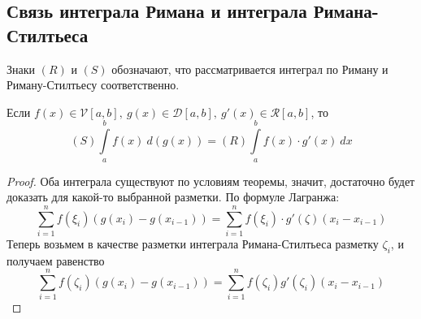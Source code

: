 \subsection{Связь интеграла Римана и интеграла Римана-Стилтьеса}
Знаки $(R)$ и $(S)$ обозначают, что рассматривается интеграл по Риману и Риману-Стилтьесу соответственно.
\begin{theorem}
    Если $f(x)\in \mathcal{V}[a,b],\ g(x)\in \mathcal{D}[a,b],\ g'(x)\in \mathcal{R}[a,b]$, то
    \[(S)\int\limits_{a}^{b}f(x)\ d(g(x))=(R)\int\limits_{a}^{b}f(x)\cdot g'(x)\ dx\]
\end{theorem} 
\begin{proof}
    Оба интеграла существуют по условиям теоремы, значит, достаточно будет доказать для какой-то выбранной разметки. По формуле Лагранжа:
    \[\sum\limits_{i=1}^{n}f(\xi_i)(g(x_i)-g(x_{i-1}))=\sum\limits_{i=1}^{n}f(\xi_i)\cdot g'(\zeta)(x_i-x_{i-1})\]
    Теперь возьмем в качестве разметки интеграла Римана-Стилтьеса разметку $\zeta_i$, и получаем равенство
    \[\sum\limits_{i=1}^{n}f(\zeta_i)(g(x_i)-g(x_{i-1}))=\sum\limits_{i=1}^{n}f(\zeta_i)g'(\zeta_i)(x_i-x_{i-1})\]
\end{proof} 
